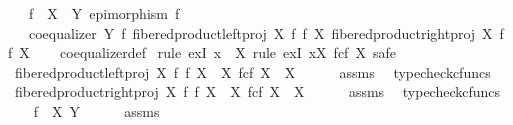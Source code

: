 \begin{isabellebody}
\ \ \ {\isachardoublequoteopen}f\ {\isacharcolon}{\kern0pt}\ X\ {\isasymrightarrow}\ Y{\isachardoublequoteclose}\ {\isachardoublequoteopen}epimorphism\ f{\isachardoublequoteclose}\isanewline
\ \ \ {\isachardoublequoteopen}coequalizer\ Y\ f\ {\isacharparenleft}{\kern0pt}fibered{\isacharunderscore}{\kern0pt}product{\isacharunderscore}{\kern0pt}left{\isacharunderscore}{\kern0pt}proj\ X\ f\ f\ X{\isacharparenright}{\kern0pt}\ {\isacharparenleft}{\kern0pt}fibered{\isacharunderscore}{\kern0pt}product{\isacharunderscore}{\kern0pt}right{\isacharunderscore}{\kern0pt}proj\ X\ f\ f\ X{\isacharparenright}{\kern0pt}{\isachardoublequoteclose}\isanewline
%
\isadelimproof
\ \ %
\endisadelimproof
%
\isatagproof
{}\isamarkupfalse%
\ coequalizer{\isacharunderscore}{\kern0pt}def\isanewline
{}\isamarkupfalse%
\ {\isacharparenleft}{\kern0pt}rule\ exI{\isacharbrackleft}{\kern0pt}\ x\ {\isacharequal}{\kern0pt}\ X{\isacharbrackright}{\kern0pt}{\isacharcomma}{\kern0pt}\ rule\ exI{\isacharbrackleft}{\kern0pt}\ x{\isacharequal}{\kern0pt}{\isachardoublequoteopen}X\ \isactrlbsub f\isactrlesub {\isasymtimes}\isactrlsub c\isactrlbsub f\isactrlesub \ X{\isachardoublequoteclose}{\isacharbrackright}{\kern0pt}{\isacharcomma}{\kern0pt}\ safe{\isacharparenright}{\kern0pt}\isanewline
\ \ \isamarkupfalse%
\ {\isachardoublequoteopen}fibered{\isacharunderscore}{\kern0pt}product{\isacharunderscore}{\kern0pt}left{\isacharunderscore}{\kern0pt}proj\ X\ f\ f\ X\ {\isacharcolon}{\kern0pt}\ X\ \isactrlbsub f\isactrlesub {\isasymtimes}\isactrlsub c\isactrlbsub f\isactrlesub \ X\ {\isasymrightarrow}\ X{\isachardoublequoteclose}\isanewline
\ \ \ \ \isamarkupfalse%
\ assms\ \isamarkupfalse%
\ typecheck{\isacharunderscore}{\kern0pt}cfuncs\isanewline
\ \ \isamarkupfalse%
\ {\isachardoublequoteopen}fibered{\isacharunderscore}{\kern0pt}product{\isacharunderscore}{\kern0pt}right{\isacharunderscore}{\kern0pt}proj\ X\ f\ f\ X\ {\isacharcolon}{\kern0pt}\ X\ \isactrlbsub f\isactrlesub {\isasymtimes}\isactrlsub c\isactrlbsub f\isactrlesub \ X\ {\isasymrightarrow}\ X{\isachardoublequoteclose}\isanewline
\ \ \ \ \isamarkupfalse%
\ assms\ \isamarkupfalse%
\ typecheck{\isacharunderscore}{\kern0pt}cfuncs\isanewline
\ \ \isamarkupfalse%
\ {\isachardoublequoteopen}f\ {\isacharcolon}{\kern0pt}\ X\ {\isasymrightarrow}Y{\isachardoublequoteclose}\isanewline
\ \ \ \ \isamarkupfalse%
\ assms\ \isamarkupfalse%

\end{isabellebody}
